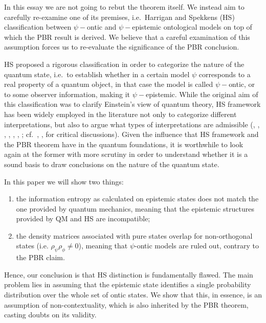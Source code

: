 \documentclass[twocolumn,prl,floatfix,superscriptaddress]{revtex4-2}
\begin{document}
In this essay we are not going to rebut the theorem itself. We instead aim to carefully re-examine one of its premises, i.e.\ Harrigan and Spekkens (HS) classification between $\psi-$ontic and $\psi-$epistemic ontological models  \cite{Harrigan:2010} on top of which the PBR result is derived. We believe that a careful examination of this assumption forces us to re-evaluate the significance of the PBR conclusion. 
		
HS proposed a rigorous classification in order to categorize the nature of the quantum state, i.e.\ to establish whether in a certain model $\psi$ corresponds to a real property of a quantum object, in that case the model is called $\psi-$ontic, or to some observer information, making it $\psi-$epistemic. While the original aim of this classification was to clarify Einstein's view of quantum theory, HS framework has been widely employed in the literature not only to categorize different interpretations, but also to argue what types of interpretations are admissible (\cite{Leifer:2013}, \cite{Leifer:2017}, \cite{Branciard:2014} \cite{Hermens:2021}, \cite{Wood:2015}, \cite{Ringbauer:2015}, \cite{Mazurek:2016}, \cite{Bartlett:2012}; cf.\ \cite{Oldofredi:2020b}, \cite{Lewis:2012}, \cite{Ladyman:2021} for critical discussions). Given the influence that HS framework and the PBR theorem have in the quantum foundations, it is worthwhile to look again at the former with more scrutiny in order to understand whether it is a sound basis to draw conclusions on the nature of the quantum state.

In this paper we will show two things:
\begin{enumerate}
	\item the information entropy as calculated on epistemic states does not match the one provided by quantum mechanics, meaning that the epistemic structures provided by QM and HS are incompatible;
	\item the density matrices associated with pure states overlap for non-orthogonal states (i.e. $\rho_\psi \rho_\phi \neq 0$), meaning that $\psi$-ontic models are ruled out, contrary to the PBR claim.
\end{enumerate}
Hence, our conclusion is that HS distinction is fundamentally flawed. The main problem lies in assuming that the epistemic state identifies a single probability distribution over the whole set of ontic states. We show that this, in essence, is an assumption of non-contextuality, which is also inherited by the PBR theorem, casting doubts on its validity.
\end{document}
